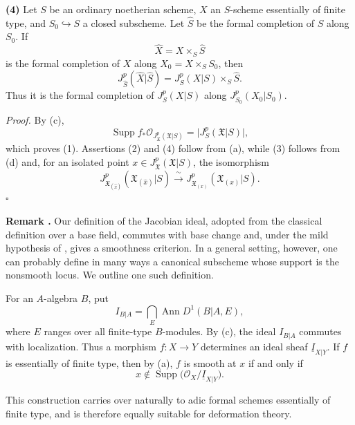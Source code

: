 \smallskip
\noindent\textbf{(4)} Let $S$ be an ordinary noetherian scheme,
$X$ an $S$-scheme essentially of finite type, and
$S_0\hookrightarrow S$ a closed subscheme. Let $\widehat S$ be the
formal completion of $S$ along $S_0$. If
\[
\widehat X=X\times_S\widehat S
\]
is the formal completion of $X$ along
$X_0=X\times_SS_0$, then
\[
J_{\widehat S}^p(\widehat X|\widehat S)
=J_S^p(X|S)\times_S\widehat S.
\]
Thus it is the formal completion of $J_S^p(X|S)$ along
$J_{S_0}^p(X_0|S_0)$.

\smallskip
\noindent\textit{Proof.}
By (c),
\[
\operatorname{Supp}
 f_*\mathcal O_{J_{\mathfrak X}^p(\mathfrak X|S)}
=\bigl|J_S^p(\mathfrak X|S)\bigr|,
\]
which proves (1). Assertions (2) and (4) follow from (a), while
(3) follows from (d) and, for an isolated point
$x\in J_{\mathfrak X}^p(\mathfrak X|S)$, the isomorphism
\[
J_{\mathfrak X_{(\widehat{x})}}^p
 (\mathfrak X_{(\widehat{x})}|S)
\xrightarrow{\ \sim\ }
J_{\mathfrak X_{(x)}}^p(\mathfrak X_{(x)}|S).
\]
\hfill$\square$

\medskip
\noindent\textbf{Remark .}
Our definition of the Jacobian ideal, adopted from the classical
definition over a base field, commutes with base change and, under the
mild hypothesis of , gives a smoothness criterion. In a general
setting, however, one can probably define in many ways a canonical
subscheme whose support is the nonsmooth locus. We outline one such
definition.

For an $A$-algebra $B$, put
\[
I_{B|A}=\bigcap_E\operatorname{Ann}D^1(B|A,E),
\]
where $E$ ranges over all finite-type $B$-modules. By (c), the
ideal $I_{B|A}$ commutes with localization. Thus a morphism
$f:X\longrightarrow Y$ determines an ideal sheaf
$\underline I_{X|Y}$. If $f$ is essentially of finite type, then by
(a), $f$ is smooth at $x$ if and only if
\[
x\notin\operatorname{Supp}
 \bigl(\mathcal O_X/\underline I_{X|Y}\bigr).
\]


This construction carries over naturally to adic formal schemes
essentially of finite type, and is therefore equally suitable for
deformation theory.

